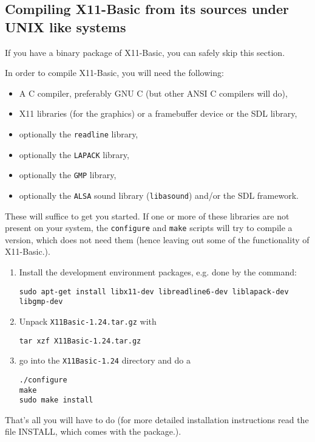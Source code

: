\subsection*{Compiling X11-Basic from its sources under UNIX like systems}

If you have a binary package of X11-Basic, you can safely skip this section.

In order to compile X11-Basic, you will need the following:

\begin{itemize}
 \item A C compiler, preferably GNU C (but other ANSI C compilers will do), 
 \item X11 libraries  (for the graphics) or a framebuffer device or the SDL library,
 \item optionally the \verb|readline| library, 
 \item optionally the \verb|LAPACK| library,
 \item optionally the \verb|GMP| library,  
 \item optionally the \verb|ALSA| sound library (\verb|libasound|) and/or the SDL framework.
\end{itemize}  

These will suffice to get you started. If one or more of these libraries are
not present on your system, the \verb|configure| and \verb|make| scripts will
try to compile a version, which does not need them (hence leaving out some of
the functionality of X11-Basic.).

\begin{enumerate}
\item Install the development environment packages, e.g. done by the command:
\begin{verbatim}
sudo apt-get install libx11-dev libreadline6-dev liblapack-dev libgmp-dev 
\end{verbatim}

\item Unpack \verb|X11Basic-1.24.tar.gz| with 
\begin{verbatim}
tar xzf X11Basic-1.24.tar.gz
\end{verbatim}
\item go into the \verb|X11Basic-1.24| directory and do a 
\begin{verbatim}
./configure
make
sudo make install
\end{verbatim}
\end{enumerate}
That's all you will have to do (for more detailed installation instructions read
the file INSTALL, which comes with the package.).

